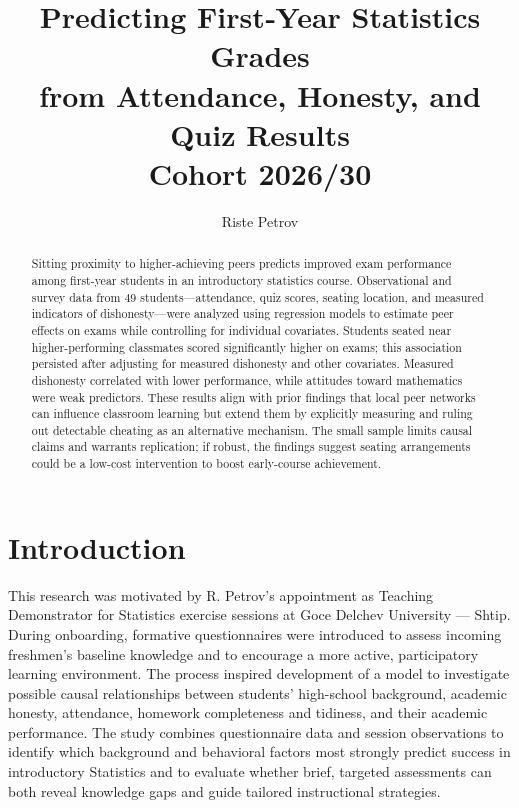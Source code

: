 \documentclass[]{article}
\title{Predicting First‑Year Statistics Grades \\
	 from Attendance, Honesty, and Quiz Results\\
	 Cohort 2026/30}
\author{Riste Petrov}
\begin{document}
	
	\maketitle
	
	\begin{abstract}
		Sitting proximity to higher-achieving peers predicts improved exam performance among first-year students in an introductory statistics course. Observational and survey data from 49 students—attendance, quiz scores, seating location, and measured indicators of dishonesty—were analyzed using regression models to estimate peer effects on exams while controlling for individual covariates. Students seated near higher-performing classmates scored significantly higher on exams; this association persisted after adjusting for measured dishonesty and other covariates. Measured dishonesty correlated with lower performance, while attitudes toward mathematics were weak predictors. These results align with prior findings that local peer networks can influence classroom learning but extend them by explicitly measuring and ruling out detectable cheating as an alternative mechanism. The small sample limits causal claims and warrants replication; if robust, the findings suggest seating arrangements could be a low-cost intervention to boost early-course achievement.
	\end{abstract}
	
	\tableofcontents
	\newpage
	
	\section{Introduction}
	This research was motivated by R. Petrov’s appointment as Teaching Demonstrator for Statistics exercise sessions at Goce Delchev University — Shtip. During onboarding, formative questionnaires were introduced to assess incoming freshmen’s baseline knowledge and to encourage a more active, participatory learning environment. The process inspired development of a model to investigate possible causal relationships between students’ high-school background, academic honesty, attendance, homework completeness and tidiness, and their academic performance. The study combines questionnaire data and session observations to identify which background and behavioral factors most strongly predict success in introductory Statistics and to evaluate whether brief, targeted assessments can both reveal knowledge gaps and guide tailored instructional strategies.\\
	
\end{document}
